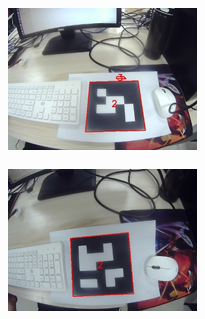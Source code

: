 \begin{figure}[htb]
	\begin{minipage}[t]{0.33\linewidth}
		\centering
		\includegraphics[width=\columnwidth]{figures/4-1a.png} 
		\label{fig:4-1a} 
	\end{minipage}
	\begin{minipage}[t]{0.33\linewidth} 
		\centering
		\includegraphics[width=\columnwidth]{figures/4-1b.png} 
		\label{fig:4-1b} 
	\end{minipage}
	\begin{minipage}[t]{0.33\linewidth} 
		\centering

\end{minipage}
\end{figure}
